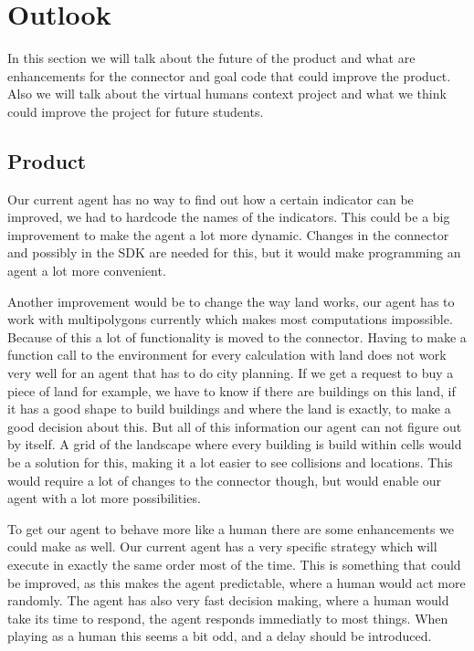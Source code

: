 \chapter{Outlook}
In this section we will talk about the future of the product and what are enhancements for the connector and goal code that could improve the product. Also we will talk about the virtual humans context project and what we think could improve the project for future students.

\section {Product}
Our current agent has no way to find out how a certain indicator can be improved, we had to hardcode the names of the indicators. This could be a big improvement to make the agent a lot more dynamic. Changes in the connector and possibly in the SDK are needed for this, but it would make programming an agent a lot more convenient.

Another improvement would be to change the way land works, our agent has to work with multipolygons currently which makes most computations impossible. Because of this a lot of functionality is moved to the connector. Having to make a function call to the environment for every calculation with land does not work very well for an agent that has to do city planning. If we get a request to buy a piece of land for example, we have to know if there are buildings on this land, if it has a good shape to build buildings and where the land is exactly, to make a good decision about this. But all of this information our agent can not figure out by itself. A grid of the landscape where every building is build within cells would be a solution for this, making it a lot easier to see collisions and locations. This would require a lot of changes to the connector though, but would enable our agent with a lot more possibilities.

To get our agent to behave more like a human there are some enhancements we could make as well. Our current agent has a very specific strategy which will execute in exactly the same order most of the time. This is something that could be improved, as this makes the agent predictable, where a human would act more randomly. The agent has also very fast decision making, where a human would take its time to respond, the agent responds immediatly to most things. When playing as a human this seems a bit odd, and a delay should be introduced.

\newpage
